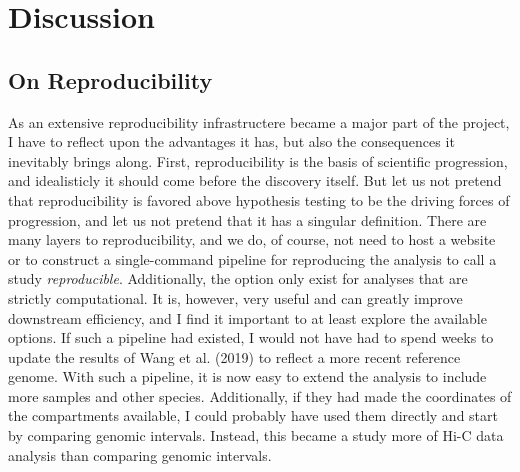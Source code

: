 \documentclass[
  11pt,
  a4paper,
]{scrbook}
\begin{document}
\newpage{}

\chapter{Discussion}\label{sec-discussion}

\section{On Reproducibility}\label{on-reproducibility}

As an extensive reproducibility infrastructere became a major part of
the project, I have to reflect upon the advantages it has, but also the
consequences it inevitably brings along. First, reproducibility is the
basis of scientific progression, and idealisticly it should come before
the discovery itself. But let us not pretend that reproducibility is
favored above hypothesis testing to be the driving forces of
progression, and let us not pretend that it has a singular definition.
There are many layers to reproducibility, and we do, of course, not need
to host a website or to construct a single-command pipeline for
reproducing the analysis to call a study \emph{reproducible}.
Additionally, the option only exist for analyses that are strictly
computational. It is, however, very useful and can greatly improve
downstream efficiency, and I find it important to at least explore the
available options. If such a pipeline had existed, I would not have had
to spend weeks to update the results of Wang et al. (2019) to reflect a
more recent reference genome. With such a pipeline, it is now easy to
extend the analysis to include more samples and other species.
Additionally, if they had made the coordinates of the compartments
available, I could probably have used them directly and start by
comparing genomic intervals. Instead, this became a study more of Hi-C
data analysis than comparing genomic intervals.
\end{document}
